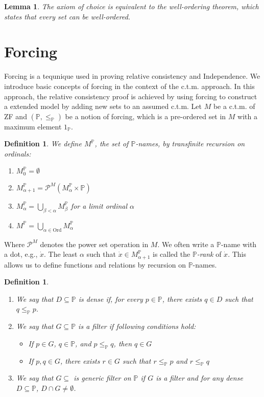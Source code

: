 \documentclass{report}
\newtheorem{lem}[thm]{Lemma}
\newtheorem{dfn}[thm]{Definition}
\newcommand{\Pbb}{\mathbb{P}}
\begin{document}
\begin{lem}
  The axiom of choice is equivalent to the well-ordering theorem, which states that every set can be well-ordered.
\end{lem}

\section{Forcing}
Forcing is a tequnique used in proving relative consistency and Independence.
We introduce basic concepts of forcing in the context of the c.t.m. approach.
In this approach, the relative consistency proof is achieved by using forcing to construct a extended model by adding new sets to an assumed c.t.m.
Let $M$ be a c.t.m. of ZF and $(\Pbb, \leq_{\Pbb})$ be a notion of forcing, which is a pre-ordered set in $M$ with a maximum element $1_{\Pbb}$.

\begin{dfn}
  We define $M^{\Pbb}$, the set of \emph{$\Pbb$-names}, by transfinite recursion on ordinals:
  \begin{enumerate}
    \item $M^{\Pbb}_0 = \emptyset$
    \item $M^{\Pbb}_{\alpha + 1} = \mathcal{P}^M(M^{\Pbb}_{\alpha} \times \Pbb)$
    \item $M^{\Pbb}_{\alpha} = \bigcup_{\beta < \alpha} M^{\Pbb}_{\beta}$ for a limit ordinal $\alpha$
    \item $M^{\Pbb} = \bigcup_{\alpha \in \text{Ord}} M^{\Pbb}_{\alpha}$
  \end{enumerate}
\end{dfn}
Where $\mathcal{P}^M$ denotes the power set operation in $M$. 
We often write a $\Pbb$-name with a dot, e.g., $\dot{x}$.
The least $\alpha$ such that $\dot{x} \in M^{\Pbb}_{\alpha + 1}$ is called the \emph{$\Pbb$-rank} of $\dot{x}$.
This allows us to define functions and relations by recursion on $\Pbb$-names.

\begin{dfn} %
  \,
  \begin{enumerate}
    \item We say that $D \subseteq \Pbb$ is \emph{dense} if, for every $p \in \Pbb$, there exists $q \in D$ such that $q \leq_{\Pbb} p$.
    \item We say that $G \subseteq \Pbb$ is a \emph{filter} if following conditions hold:
      \begin{itemize}
        \item If $p \in G$, $q \in \Pbb$, and $p \leq_{\Pbb} q$, then $q \in G$
        \item If $p, q \in G$, there exists $r \in G$ such that $r \leq_{\Pbb} p$ and $r \leq_{\Pbb} q$
      \end{itemize}
    \item We say that $G \subseteq$ is \emph{generic filter} on $\Pbb$ if $G$ is a filter and for any dense $D \subseteq \Pbb$, $D \cap G \neq \emptyset$.
  \end{enumerate}
\end{dfn}
\end{document}
